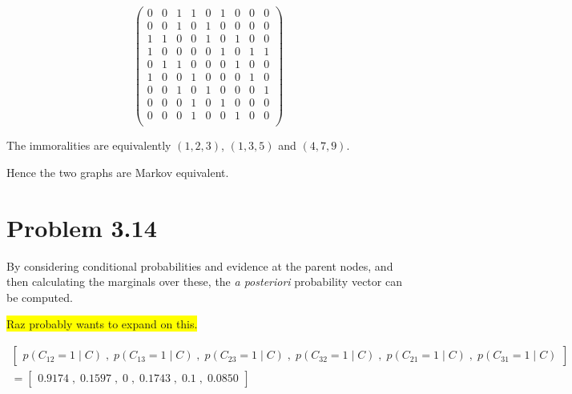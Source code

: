 \documentclass[11pt,a4paper,oneside]{report}
\newcommand{\hilight}[1]{\colorbox{yellow}{#1}}
\begin{document}
\begin{equation}
\begin{pmatrix}
 0 & 0 & 1 & 1 & 0 & 1 & 0 & 0 & 0 \\
 0 & 0 & 1 & 0 & 1 & 0 & 0 & 0 & 0 \\
 1 & 1 & 0 & 0 & 1 & 0 & 1 & 0 & 0 \\
 1 & 0 & 0 & 0 & 0 & 1 & 0 & 1 & 1 \\
 0 & 1 & 1 & 0 & 0 & 0 & 1 & 0 & 0 \\
 1 & 0 & 0 & 1 & 0 & 0 & 0 & 1 & 0 \\
 0 & 0 & 1 & 0 & 1 & 0 & 0 & 0 & 1 \\
 0 & 0 & 0 & 1 & 0 & 1 & 0 & 0 & 0 \\
 0 & 0 & 0 & 1 & 0 & 0 & 1 & 0 & 0 \\
\end{pmatrix}
\end{equation}

The immoralities are equivalently $\left( 1, 2, 3\right)$, $\left( 1, 3, 5 \right)$ and
$\left( 4, 7, 9 \right)$.

Hence the two graphs are Markov equivalent.

\section*{Problem 3.14}
By considering conditional probabilities and evidence at the parent nodes, and 
then calculating the marginals over these, the \emph{a posteriori} probability 
vector can be computed.

\hilight{Raz probably wants to expand on this.}

\begin{equation}
\begin{split}
\begin{bmatrix}
p(C_{12} = 1 \; | \; C) \; , \; p(C_{13} = 1 \; | \; C)  \; , \; p(C_{23} = 1 \; | \; C) \; , \; p(C_{32} = 1 \; | \; C) \; , \;
p(C_{21} = 1 \; | \; C) \; , \; p(C_{31} = 1 \; | \; C) 
\end{bmatrix} \\ = 
\begin{bmatrix}
0.9174 \; , \; 0.1597 \; , \; 0 \; , \; 0.1743 \; , \; 0.1 \; , \; 0.0850
\end{bmatrix}
\end{split}
\end{equation}
\end{document}
